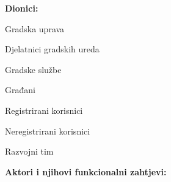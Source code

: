 			\noindent \textbf{Dionici:}
			
			\begin{packed_enum}
				\item Gradska uprava
				\item Djelatnici gradskih ureda		
				\item Gradske službe
				\item Građani
				\item[] \begin{packed_item}
					\item Registrirani korisnici
					\item Neregistrirani korisnici
				\end{packed_item}
				\item Razvojni tim
			\end{packed_enum}
			
			
			\noindent \textbf{Aktori i njihovi funkcionalni zahtjevi:}
			
